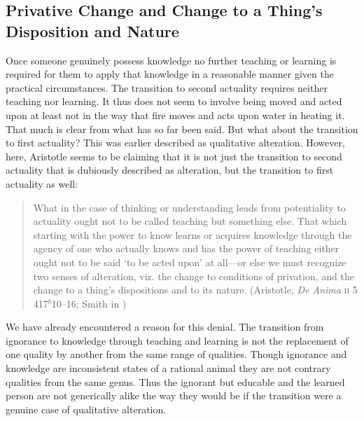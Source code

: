 \subsection{Privative Change and Change to a Thing's Disposition and Nature} %
\label{sub:privative_and_nonprivative_change}

Once someone genuinely possess knowledge no further teaching or learning is required for them to apply that knowledge in a reasonable manner given the practical circumstances. The transition to second actuality requires neither teaching nor learning. It thus does not seem to involve being moved and acted upon at least not in the way that fire moves and acts upon water in heating it. That much is clear from what has so far been said. But what about the transition to first actuality? This was earlier described as qualitative alteration. However, here, Aristotle seems to be claiming that it is not just the transition to second actuality that is dubiously described as alteration, but the transition to first actuality as well:
\begin{quote}
	What in the case of thinking or understanding leads from potentiality to actuality ought not to be called teaching but something else. That which starting with the power to know learns or acquires knowledge through the agency of one who actually knows and has the power of teaching either ought not to be said `to be acted upon' at all---or else we must recognize two senses of alteration, viz. the change to conditions of privation, and the change to a thing's dispositions and to its nature. (Aristotle, \emph{De Anima} \textsc{ii} 5 417\( ^{b} \)10--16; Smith in \citealt[30--31]{Barnes:1984uq})
\end{quote}
We have already encountered a reason for this denial. The transition from ignorance to knowledge through teaching and learning is not the replacement of one quality by another from the same range of qualities. Though ignorance and knowledge are inconsistent states of a rational animal they are not contrary qualities from the same genus. Thus the ignorant but educable and the learned person are not generically alike the way they would be if the transition were a genuine case of qualitative alteration. 

